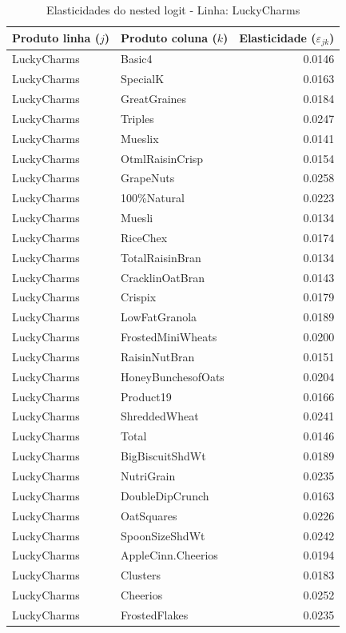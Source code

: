 \begingroup
\begin{table}[H]
\centering
\caption{Elasticidades do nested logit - Linha: LuckyCharms}
\label{tab:elas-nested-luckycharms}
\small
\begin{tabular}{llr}
\toprule
Produto linha ($j$) & Produto coluna ($k$) & Elasticidade ($\varepsilon_{jk}$) \\
\midrule
LuckyCharms & Basic4 & 0.0146 \\
LuckyCharms & SpecialK & 0.0163 \\
LuckyCharms & GreatGraines & 0.0184 \\
LuckyCharms & Triples & 0.0247 \\
LuckyCharms & Mueslix & 0.0141 \\
LuckyCharms & OtmlRaisinCrisp & 0.0154 \\
LuckyCharms & GrapeNuts & 0.0258 \\
LuckyCharms & 100\%Natural & 0.0223 \\
LuckyCharms & Muesli & 0.0134 \\
LuckyCharms & RiceChex & 0.0174 \\
LuckyCharms & TotalRaisinBran & 0.0134 \\
LuckyCharms & CracklinOatBran & 0.0143 \\
LuckyCharms & Crispix & 0.0179 \\
LuckyCharms & LowFatGranola & 0.0189 \\
LuckyCharms & FrostedMiniWheats & 0.0200 \\
LuckyCharms & RaisinNutBran & 0.0151 \\
LuckyCharms & HoneyBunchesofOats & 0.0204 \\
LuckyCharms & Product19 & 0.0166 \\
LuckyCharms & ShreddedWheat & 0.0241 \\
LuckyCharms & Total & 0.0146 \\
LuckyCharms & BigBiscuitShdWt & 0.0189 \\
LuckyCharms & NutriGrain & 0.0235 \\
LuckyCharms & DoubleDipCrunch & 0.0163 \\
LuckyCharms & OatSquares & 0.0226 \\
LuckyCharms & SpoonSizeShdWt & 0.0242 \\
LuckyCharms & AppleCinn.Cheerios & 0.0194 \\
LuckyCharms & Clusters & 0.0183 \\
LuckyCharms & Cheerios & 0.0252 \\
LuckyCharms & FrostedFlakes & 0.0235 \\

\end{tabular}
\end{table}
